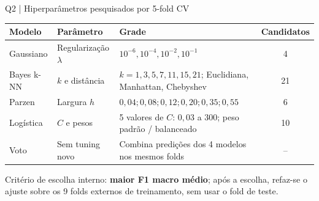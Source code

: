 \documentclass[aspectratio=169,11pt]{beamer}
\begin{document}
\begin{frame}[t]{Q2 | Hiperparâmetros pesquisados por 5-fold CV}

\par
\scriptsize
\renewcommand{\arraystretch}{1.32}
\setlength{\tabcolsep}{4pt}
\centering
\begin{tabular}{lp{2.15cm}p{6.35cm}c}
\toprule
Modelo & Parâmetro & Grade & Candidatos \\
\midrule
Gaussiano & Regularização $\lambda$ & {$10^{-6},10^{-4},10^{-2},10^{-1}$} & 4 \\
Bayes k-NN & $k$ e distância & $k=1,3,5,7,11,15,21$; Euclidiana, Manhattan, Chebyshev & 21 \\
Parzen & Largura $h$ & $0,04;0,08;0,12;0,20;0,35;0,55$ & 6 \\
Logística & $C$ e pesos & 5 valores de $C$: $0,03$ a $300$; peso padrão / balanceado & 10 \\
Voto & Sem tuning novo & Combina predições dos 4 modelos nos mesmos folds & -- \\
\bottomrule
\end{tabular}
\par
\vspace{2mm}
\begin{notabox}\scriptsize Critério de escolha interno: \textbf{maior F1 macro médio}; após a escolha, refaz-se o ajuste sobre os 9 folds externos de treinamento, sem usar o fold de teste.\end{notabox}

\end{frame}
\end{document}
